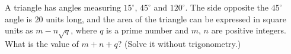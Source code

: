 A triangle has angles measuring $15^\circ$, $45^\circ$ and $120^\circ$. The side opposite the $45^\circ$ angle is $20$ units long, and the area of the triangle can be expressed in square units as $m-n\sqrt q$, where $q$ is a prime number and $m$, $n$ are positive integers. What is the value of $m+n+q$? (Solve it without trigonometry.)
